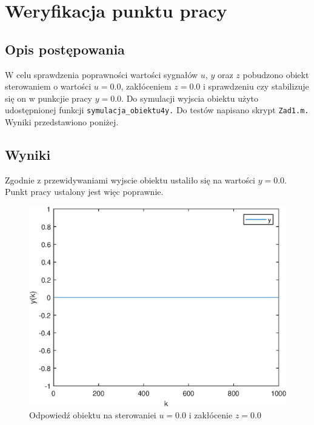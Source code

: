 \chapter{Weryfikacja punktu pracy}
\label{zad1}

\section{Opis postępowania}
\label{zad1_opis}
W celu sprawdzenia poprawności wartości sygnałów $u$, $y$ oraz $z$ pobudzono obiekt sterowaniem
o wartości $u = \num{0.0}$, zakłóceniem $z = \num{0.0}$ i sprawdzeniu czy stabilizuje się on w punkcjie pracy  $y = \num{0.0}$. Do symulacji wyjscia obiektu użyto udostępnionej funkcji 
\verb+symulacja_obiektu4y.+ Do testów napisano skrypt \verb+Zad1.m. + Wyniki przedstawiono poniżej.

\section{Wyniki}
\label{zad1_wyniki}
Zgodnie z przewidywaniami wyjscie obiektu ustaliło się na wartości $y= \num{0.0}$. Punkt pracy ustalony jest więc poprawnie.
\begin{figure}[tb]
	\centering
	\includegraphics[scale=1]{Rys/punkt_pracy.eps}
	\caption{Odpowiedź obiektu na sterowaniei $u=\num{0.0}$ i zakłócenie $z = \num{0.0}$}
\end{figure}